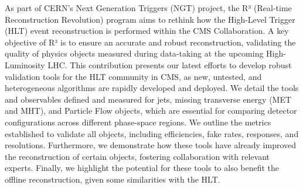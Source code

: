 As part of CERN's Next Generation Triggers (NGT) project, the R³ (Real-time Reconstruction Revolution) program aims to rethink how the High-Level Trigger (HLT) event reconstruction is performed within the CMS Collaboration.
A key objective of R³ is to ensure an accurate and robust reconstruction, validating the quality of physics objects measured during data-taking at the upcoming High-Luminosity LHC.
This contribution presents our latest efforts to develop robust validation tools for the HLT community in CMS, as new, untested, and heterogeneous algorithms are rapidly developed and deployed.
We detail the tools and observables defined and measured for jets, missing transverse energy (MET and MHT), and Particle Flow objects, which are essential for comparing detector configurations across different phase-space regions.
We outline the metrics established to validate all objects, including efficiencies, fake rates, responses, and resolutions.
Furthermore, we demonstrate how these tools have already improved the reconstruction of certain objects, fostering collaboration with relevant experts.
Finally, we highlight the potential for these tools to also benefit the offline reconstruction, given some similarities with the HLT.
